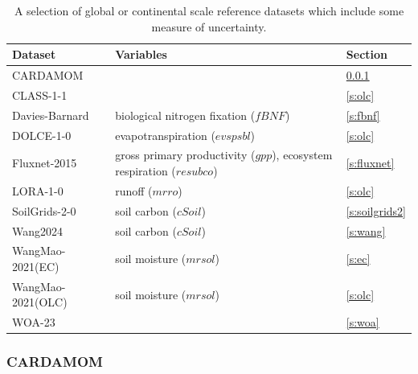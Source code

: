 \documentclass{agujournal}
\begin{document}
\begin{table}[ht]
	\caption{A selection of global or continental scale reference datasets which include some measure of uncertainty.}\label{t:datasets}
	\begin{tabular}{lp{7cm}l}
		\hline
		Dataset           & Variables                                                                               & Section            \\
		\hline
		CARDAMOM          & \cardvars                                                                               & \ref{s:cardamom}   \\
		CLASS-1-1         & \classvars                                                                              & \ref{s:olc}        \\
		Davies-Barnard    & biological nitrogen fixation ($\mathit{fBNF}$)                                          & \ref{s:fbnf}       \\
		DOLCE-1-0         & evapotranspiration ($\mathit{evspsbl}$)                                                 & \ref{s:olc}        \\
		Fluxnet-2015      & gross primary productivity ($\mathit{gpp}$), ecosystem respiration ($\mathit{resubco}$) & \ref{s:fluxnet}    \\
		LORA-1-0          & runoff ($\mathit{mrro}$)                                                                & \ref{s:olc}        \\
		SoilGrids-2-0     & soil carbon ($\mathit{cSoil}$)                                                          & \ref{s:soilgrids2} \\
		Wang2024          & soil carbon ($\mathit{cSoil}$)                                                          & \ref{s:wang}       \\
		WangMao-2021(EC)  & soil moisture ($\mathit{mrsol}$)                                                        & \ref{s:ec}         \\
		WangMao-2021(OLC) & soil moisture ($\mathit{mrsol}$)                                                        & \ref{s:olc}        \\
		WOA-23            & \woavars                                                                                & \ref{s:woa}        \\
		\hline
	\end{tabular}
\end{table}

\subsubsection{CARDAMOM}\label{s:cardamom}
\end{document}
